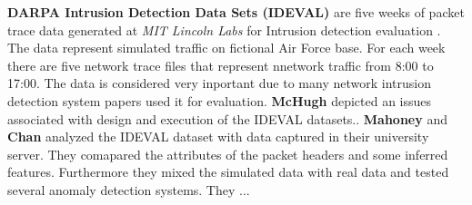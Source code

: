 \textbf{DARPA Intrusion Detection Data Sets (IDEVAL)} are five weeks of packet trace data generated at \emph{MIT Lincoln Labs} for
Intrusion detection evaluation \cite{darpa1999ids}.  The data represent simulated traffic on fictional Air Force base.
For each week there are five network trace files that represent nnetwork traffic from 8:00 to 17:00. The data is considered
very inportant due to many network intrusion detection system papers used it for evaluation.
%
\textbf{McHugh} \cite{mchugh2000testing} depicted an issues associated with design and execution of the IDEVAL datasets..
%
\textbf{Mahoney} and \textbf{Chan} \cite{mahoney2003analysis}
 analyzed the IDEVAL dataset with data captured in their university server.
They comapared the attributes of the packet headers and some inferred features. Furthermore they mixed the simulated data with real data
and tested several anomaly detection systems. They ... %
%
%

